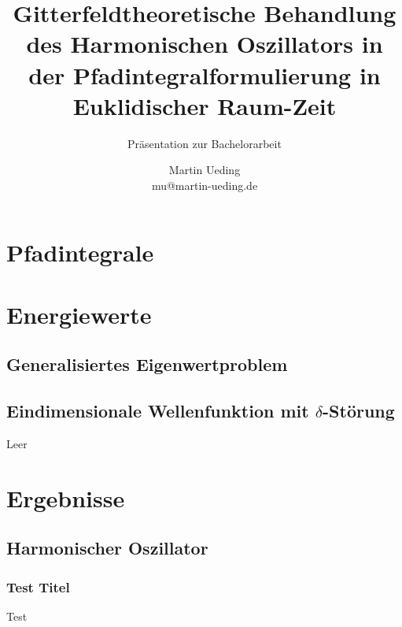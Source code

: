\documentclass[11pt, ngerman, fleqn]{beamer}
\title{Gitterfeldtheoretische Behandlung des Harmonischen Oszillators in der Pfadintegralformulierung in Euklidischer Raum-Zeit}
\subtitle{Präsentation zur Bachelorarbeit}
\author{
    Martin Ueding \\ mu@martin-ueding.de
}
\begin{document}
\begin{frame}
    \titlepage
\end{frame}

\begin{frame}
    \tableofcontents
\end{frame}

\section{Pfadintegrale}

\section{Energiewerte}

\subsection{Generalisiertes Eigenwertproblem}

\subsection{Eindimensionale Wellenfunktion mit $\delta$-Störung}

\begin{frame}
    Leer
\end{frame}


\section{Ergebnisse}

\subsection{Harmonischer Oszillator}

\begin{frame}
    \frametitle{Test Titel}
   Test 
\end{frame}
\end{document}
